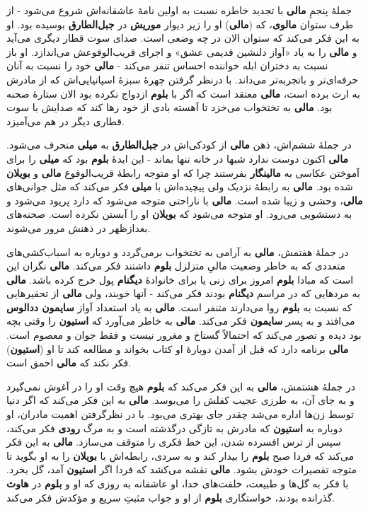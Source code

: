 \documentclass[12pt]{book}
\newcommand{\noun}[1]{{\textbf{#1}}}
\begin{document}
    جملهٔ پنجمِ \noun{مالی} با تجدید خاطره نسبت به اولین نامهٔ عاشقانه‌اش شروع می‌شود - از طرف ستوان \noun{مالوی}، که (\noun{مالی}) او را زیر دیوار \noun{موریش} در \noun{جبل‌الطارق} بوسیده بود. او به این فکر می‌کند که ستوان الان در چه وضعی است. صدای سوت قطار دیگری می‌آید و \noun{مالی} را به یاد «آواز دلنشین قدیمی عشق» و اجرای قریب‌الوقوعش می‌اندازد. او باز نسبت به دختران ابله خواننده احساس تنفر می‌کند - \noun{مالی} خود را نسبت به آنان حرفه‌ای‌تر و باتجربه‌تر می‌داند. با درنظر گرفتن چهرهٔ سبزهٔ اسپانیایی‌اش که از مادرش به ارث برده است، \noun{مالی} معتقد است که اگر با \noun{بلوم} ازدواج نکرده بود الان ستارهٔ صحنه بود. \noun{مالی} به تختخواب می‌خزد تا آهسته بادی از خود رها کند که صدایش با سوت قطاری دیگر در هم می‌آمیزد.

    در جملهٔ ششم‌اش، ذهن \noun{مالی} از کودکی‌اش در \noun{جبل‌الطارق} به \noun{میلی} منحرف می‌شود. \noun{مالی} اکنون دوست ندارد شبها در خانه تنها بماند - این ایدهٔ \noun{بلوم} بود که \noun{میلی} را برای آموختن عکاسی به \noun{مالینگار} بفرستند چرا که او متوجه رابطهٔ قریب‌الوقوع \noun{مالی} و \noun{بویلان} شده بود. \noun{مالی} به رابطهٔ نزدیک ولی پیچیده‌اش با \noun{میلی} فکر می‌کند که مثل جوانی‌های \noun{مالی}، وحشی و زیبا شده است. \noun{مالی} با ناراحتی متوجه می‌شود که دارد پریود می‌شود و به دستشویی می‌رود. او متوجه می‌شود که \noun{بویلان} او را آبستن نکرده است. صحنه‌های بعدازظهر در ذهنش مرور می‌شوند.

    در جملهٔ هفتمش، \noun{مالی} به آرامی به تختخواب برمی‌گردد و دوباره به اسباب‌کشی‌های متعددی که به خاطر وضعیت مالیِ متزلزل \noun{بلوم} داشتند فکر می‌کند. \noun{مالی} نگران این است که مبادا \noun{بلوم} امروز برای زنی یا برای خانوادهٔ \noun{دیگنام} پول خرج کرده باشد. \noun{مالی} به مردهایی که در مراسم \noun{دیگنام} بودند فکر می‌کند - آنها خوبند، ولی \noun{مالی} از تحقیرهایی که نسبت به \noun{بلوم} روا می‌دارند متنفر است. \noun{مالی} به یاد استعداد آواز \noun{سایمون ددالوس‬} می‌افتد و به پسر \noun{سایمون}  فکر می‌کند. \noun{مالی} به خاطر می‌آورد که \noun{استیون} را وقتی بچه بود دیده و تصور می‌کند که احتمالاً گستاخ و مغرور نیست و فقط جوان و معصوم است. \noun{مالی} برنامه دارد که قبل از آمدن دوبارهٔ او کتاب بخواند و مطالعه کند تا او (\noun{استیون}) فکر نکند که \noun{مالی} احمق است.

    در جملهٔ هشتمش، \noun{مالی} به این فکر می‌کند که \noun{بلوم} هیچ وقت او را در آغوش نمی‌گیرد و به جای آن، به طرزی عجیب کفلش را می‌بوسد. \noun{مالی} به این فکر می‌کند که اگر دنیا توسط زن‌ها اداره می‌شد چقدر جای بهتری می‌بود. با در نظرگرفتن اهمیت مادران، او دوباره به \noun{استیون} که مادرش به تازگی درگذشته است و به مرگ \noun{رودی} فکر می‌کند، سپس از ترس افسرده شدن، این خط فکری را متوقف می‌سازد. \noun{مالی} به این فکر می‌کند که فردا صبح \noun{بلوم} را بیدار کند و به سردی، رابطه‌اش با \noun{بویلان} را به او بگوید تا متوجه تقصیرات خودش بشود. \noun{مالی} نقشه می‌کشد که فردا اگر \noun{استیون} آمد، گل بخرد. با فکر به گل‌ها و طبیعت، خلقت‌های خدا، او عاشقانه به روزی که او و \noun{بلوم} در \noun{هاوث} گذرانده بودند، خواستگاری‌ \noun{بلوم} از او و جواب مثبتِ سریع و مؤکدش فکر می‌کند.
\end{document}
